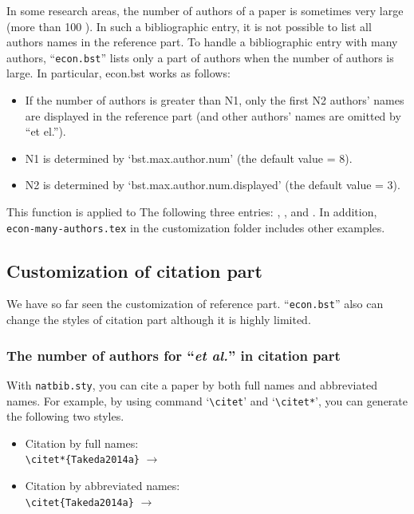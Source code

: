 \documentclass[10pt]{article}
\begin{document}
In some research areas, the number of authors of a paper is sometimes very large
(more than 100 ). In such a bibliographic entry, it is not possible to list all
authors names in the reference part.  To handle a bibliographic entry with many
authors, ``\texttt{econ.bst}'' lists only a part of authors when the number of
authors is large. In particular, econ.bst works as follows:
\begin{itemize}
 \item If the number of authors is greater than N1, only the first N2 authors'
       names are displayed in the reference part (and other authors' names are
       omitted by ``et el.'').
 \item N1 is determined by `bst.max.author.num' (the default value = 8).
 \item N2 is determined by `bst.max.author.num.displayed' (the default value =
       3).
\end{itemize}

This function is applied to The following three entries:
\citet{essd-10-405-2018}, \citet{luthi08:_high}, and
\citet{doi:10.1175/2009BAMS2778.1}. In addition, \texttt{econ-many-authors.tex}
in the customization folder includes other examples.


\subsection{Customization of citation part}

We have so far seen the customization of reference part. ``\texttt{econ.bst}''
also can change the styles of citation part although it is highly limited.

\subsubsection{The number of authors for ``\textit{et al.}'' in citation part}

With \texttt{natbib.sty}, you can cite a paper by both full names and
abbreviated names. For example, by using command `\verb|\citet|' and
`\verb|\citet*|', you can generate the following two styles.
\begin{itemize}
 \item Citation by full names: \\
       \verb|\citet*{Takeda2014a}| $\longrightarrow$ \citet*{Takeda2014a}
 \item Citation by abbreviated names: \\
       \verb|\citet{Takeda2014a}| $\longrightarrow$ \citet{Takeda2014a}
\end{itemize}
\end{document}
